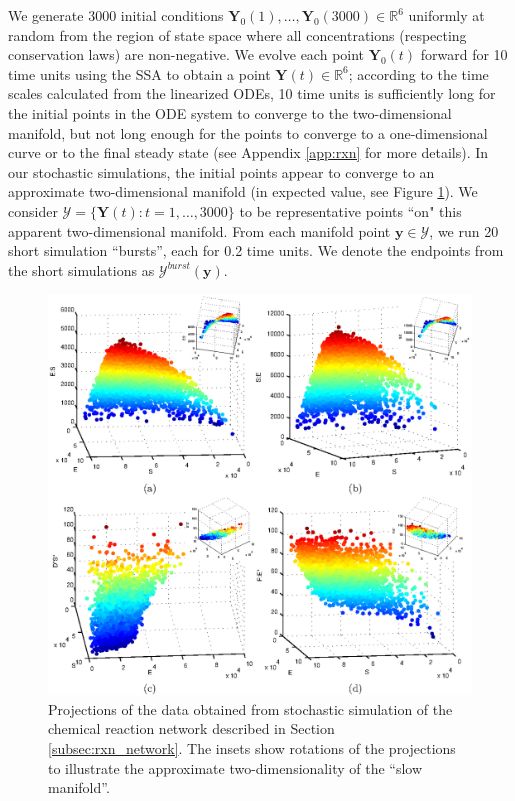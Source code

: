 We generate 3000 initial conditions $\mathbf{Y}_0(1), \dots, \mathbf{Y}_0(3000) \in \mathbb{R}^6$ uniformly at random from the
region of state space where all concentrations (respecting conservation laws) are non-negative.
%
We evolve each point $\mathbf{Y}_0(t)$ forward for 10 time units using the SSA to obtain a point $\mathbf{Y}(t) \in \mathbb{R}^6$;
according to the time scales calculated from the linearized ODEs, 10 time units is sufficiently long for the initial points in the ODE system to converge to the two-dimensional manifold,
but not long enough for the points to converge to a one-dimensional curve or to the final steady state (see Appendix \ref{app:rxn} for more details).
%
In our stochastic simulations, the initial points appear to converge to an approximate two-dimensional manifold
(in expected value, see Figure \ref{fig:rxn_manifolds}).
%
We consider $\mathcal{Y} = \{ \mathbf{Y}(t): t=1, \dots, 3000 \}$ to be representative points ``on" this apparent two-dimensional manifold.
%
From each manifold point $\mathbf{y} \in \mathcal{Y}$, we run 20 short simulation ``bursts'', each for 0.2 time units.
%
We denote the endpoints from the short simulations as $\mathcal{Y}^{burst}(\mathbf{y})$.

\begin{figure}[t]
  \includegraphics[width=6in]{fig3}
    \caption[Projections of the data obtained from stochastic simulation of the chemical reaction network]{Projections of the data obtained from stochastic simulation of the chemical reaction network described in Section \ref{subsec:rxn_network}. The insets show rotations of the projections to illustrate the approximate two-dimensionality of the ``slow manifold''.}
    \label{fig:rxn_manifolds}
\end{figure}


